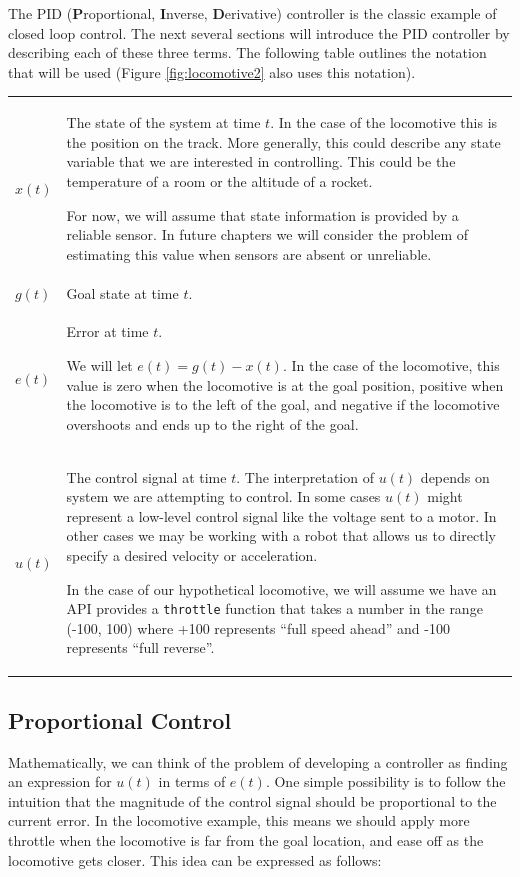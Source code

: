 The PID (\textbf{P}roportional, \textbf{I}nverse, \textbf{D}erivative)
controller is the classic example of closed loop control.  The next
several sections will introduce the PID controller by describing each
of these three terms.  The following table outlines the notation
that will be used (Figure
\ref{fig:locomotive2} also uses this notation).


\begin{tabular}{l p{4in}}
$x(t)$ &

  The state of the system at time $t$.  In the case of the locomotive
  this is the position on the track. More generally, this could
  describe any state variable that we are interested in controlling.
  This could be the temperature of a room or the altitude of a
  rocket.

  For now, we will assume that state information is provided by a
  reliable sensor.  In future chapters we will consider the problem of
  estimating this value when sensors are absent or unreliable.\\

$g(t)$ & Goal state at time $t$. \\

$e(t)$ & Error at time $t$.

 We will let $e(t) = g(t) - x(t)$. In the case of the locomotive, this
 value is zero when the locomotive is at the goal position, positive
 when the locomotive is to the left of the goal, and negative if the
 locomotive overshoots and ends up to the right of the goal. \\

$u(t)$ & The control signal at time $t$. The interpretation of $u(t)$
 depends on system we are attempting to control.  In some cases $u(t)$
 might represent a low-level control signal like the voltage sent to a
 motor. In other cases we may be working with a robot that allows us
 to directly specify a desired velocity or acceleration.

 In the case of our hypothetical locomotive, we will assume we have an
 API provides a \verb+throttle+ function that takes a number in the
 range (-100, 100) where +100 represents ``full speed ahead'' and -100
 represents ``full reverse''.
\end{tabular}

\subsection{Proportional Control}

Mathematically, we can think of the problem of developing a controller
as finding an expression for $u(t)$ in terms of $e(t)$.  One simple
possibility is to follow the intuition that the magnitude of the control
signal should be proportional to the current error.  In the locomotive
example, this means we should apply more throttle when the locomotive
is far from the goal location, and ease off as the locomotive gets
closer.  This idea can be expressed as follows:

